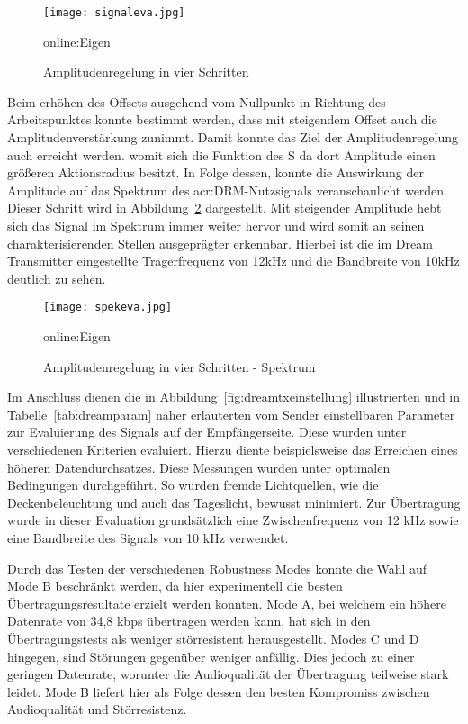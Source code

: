 \begin{figure}[h]
	\centering
	\texttt{[image: signaleva.jpg]}
	\caption[Amplitudenregelung in vier Schritten]{Amplitudenregelung in vier Schritten}
	\gls{online:Eigen}
	\label{fig:Amplitudenregelung}
\end{figure}

Beim erhöhen des Offsets ausgehend vom Nullpunkt in Richtung des Arbeitspunktes konnte bestimmt werden, dass mit steigendem Offset auch die Amplitudenverstärkung zunimmt. Damit konnte das Ziel der Amplitudenregelung auch erreicht werden. womit sich die Funktion des S da dort Amplitude einen größeren Aktionsradius besitzt. In Folge dessen, konnte die Auswirkung der Amplitude auf das Spektrum des \gls{acr:DRM}-Nutzsignals veranschaulicht werden. Dieser Schritt wird in Abbildung~\ref{fig:speki} dargestellt. Mit steigender Amplitude hebt sich das Signal im Spektrum immer weiter hervor und wird somit an seinen charakterisierenden Stellen ausgeprägter erkennbar. Hierbei ist die im Dream Transmitter eingestellte Trägerfrequenz von 12kHz und die Bandbreite von 10kHz deutlich zu sehen.


\begin{figure}[h]
	\centering
	\texttt{[image: spekeva.jpg]}
	\caption[Amplitudenregelung in vier Schritten - Spektrum]{Amplitudenregelung in vier Schritten - Spektrum}\gls{online:Eigen}
	\label{fig:speki}
\end{figure}


Im Anschluss dienen die in Abbildung~\ref{fig:dreamtxeinstellung} illustrierten und in Tabelle~\ref{tab:dreamparam} näher erläuterten vom Sender einstellbaren Parameter zur Evaluierung des Signals auf der Empfängerseite. Diese wurden unter verschiedenen Kriterien evaluiert. Hierzu diente beispielsweise das Erreichen eines höheren Datendurchsatzes. Diese Messungen wurden unter optimalen Bedingungen durchgeführt. So wurden fremde Lichtquellen, wie die Deckenbeleuchtung und auch das Tageslicht, bewusst minimiert. Zur Übertragung wurde in dieser Evaluation grundsätzlich eine Zwischenfrequenz von 12 kHz sowie eine Bandbreite des Signals von 10 kHz verwendet.

Durch das Testen der verschiedenen Robustness Modes konnte die Wahl auf Mode B beschränkt werden, da hier experimentell die besten Übertragungsresultate erzielt werden konnten. Mode A, bei welchem ein höhere Datenrate von 34,8 kbps übertragen werden kann, hat sich in den Übertragungstests als weniger störresistent herausgestellt. Modes C und D hingegen, sind Störungen gegenüber weniger anfällig. Dies jedoch zu einer geringen Datenrate, worunter die Audioqualität der Übertragung teilweise stark leidet. Mode B liefert hier als Folge dessen den besten Kompromiss zwischen Audioqualität und Störresistenz.

